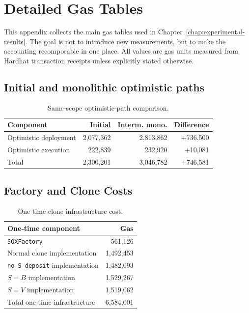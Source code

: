 \chapter{Detailed Gas Tables}
\label{app:detailed-gas-tables}

This appendix collects the main gas tables used in Chapter~\ref{chap:experimental-results}.
The goal is not to introduce new measurements, but to make the accounting recomposable in
one place. All values are gas units measured from Hardhat transaction receipts unless
explicitly stated otherwise.

\section{Initial and monolithic optimistic paths}

\begin{table}[htbp]
  \centering
  \begin{tabular}{lrrr}
    \toprule
    Component & Initial & Interm. mono. & Difference \\
    \midrule
    Optimistic deployment & 2,077,362 & 2,813,862 & +736,500 \\
    Optimistic execution & 222,839 & 232,920 & +10,081 \\
    \midrule
    Total & 2,300,201 & 3,046,782 & +746,581 \\
    \bottomrule
  \end{tabular}
  \caption{Same-scope optimistic-path comparison.}
  \label{tab:app-optimistic-baseline}
\end{table}

\section{Factory and Clone Costs}

\begin{table}[htbp]
  \centering
  \begin{tabularx}{\linewidth}{>{\raggedright\arraybackslash}Xr}
    \toprule
    One-time component & Gas \\
    \midrule
    \texttt{SOXFactory} & 561,126 \\
    Normal clone implementation & 1,492,453 \\
    \texttt{no\_S\_deposit} implementation & 1,482,093 \\
    \(S=B\) implementation & 1,529,267 \\
    \(S=V\) implementation & 1,519,062 \\
    \midrule
    Total one-time infrastructure & 6,584,001 \\
    \bottomrule
  \end{tabularx}
  \caption{One-time clone infrastructure cost.}
  \label{tab:app-clone-infrastructure}
\end{table}

